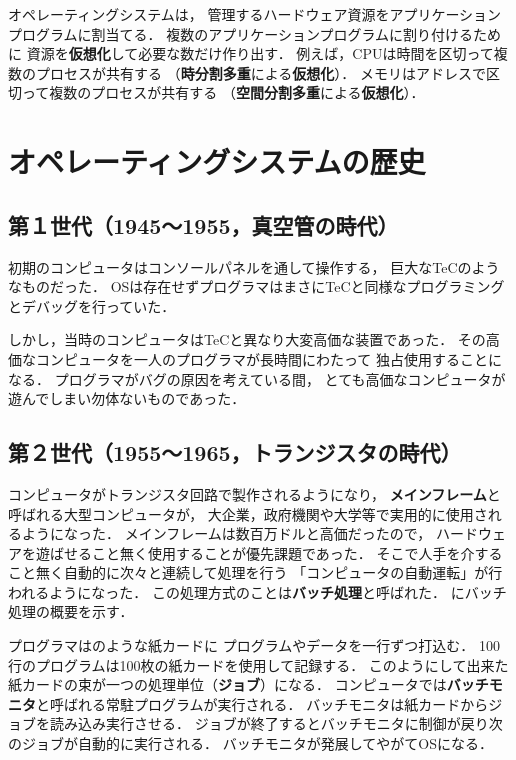 オペレーティングシステムは，
管理するハードウェア資源をアプリケーションプログラムに割当てる．
複数のアプリケーションプログラムに割り付けるために
資源を{\bf 仮想化}して必要な数だけ作り出す．
例えば，CPUは時間を区切って複数のプロセスが共有する
（{\bf 時分割多重}による{\bf 仮想化}）．
メモリはアドレスで区切って複数のプロセスが共有する
（{\bf 空間分割多重}による{\bf 仮想化}）．


\section{オペレーティングシステムの歴史}

\subsection{第１世代（1945〜1955，真空管の時代）}
初期のコンピュータはコンソールパネルを通して操作する，
巨大なTeCのようなものだった．
OSは存在せずプログラマはまさにTeCと同様なプログラミングとデバッグを行っていた．

しかし，当時のコンピュータはTeCと異なり大変高価な装置であった．
その高価なコンピュータを一人のプログラマが長時間にわたって
独占使用することになる．
プログラマがバグの原因を考えている間，
とても高価なコンピュータが遊んでしまい勿体ないものであった．

\subsection{第２世代（1955〜1965，トランジスタの時代）}

コンピュータがトランジスタ回路で製作されるようになり，
{\bf メインフレーム}と呼ばれる大型コンピュータが，
大企業，政府機関や大学等で実用的に使用されるようになった．
メインフレームは数百万ドルと高価だったので，
ハードウェアを遊ばせること無く使用することが優先課題であった．
そこで人手を介すること無く自動的に次々と連続して処理を行う
「コンピュータの自動運転」が行われるようになった．
この処理方式のことは{\bf バッチ処理}と呼ばれた．
にバッチ処理の概要を示す．

プログラマはのような紙カードに
プログラムやデータを一行ずつ打込む．
100行のプログラムは100枚の紙カードを使用して記録する．
このようにして出来た紙カードの束が一つの処理単位（{\bf ジョブ}）になる．
コンピュータでは{\bf バッチモニタ}と呼ばれる常駐プログラムが実行される．
バッチモニタは紙カードからジョブを読み込み実行させる．
ジョブが終了するとバッチモニタに制御が戻り次のジョブが自動的に実行される．
バッチモニタが発展してやがてOSになる．

